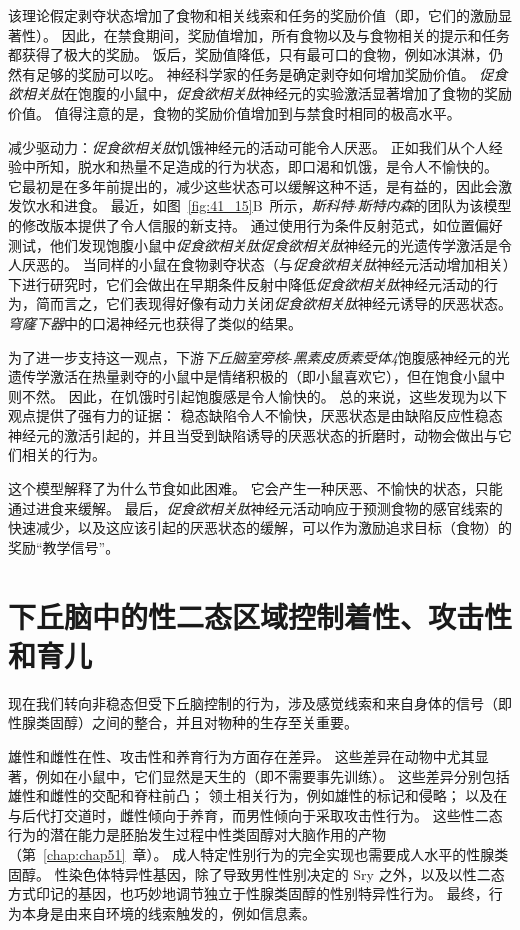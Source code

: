 该理论假定剥夺状态增加了食物和相关线索和任务的奖励价值（即，它们的激励显著性）。
因此，在禁食期间，奖励值增加，所有食物以及与食物相关的提示和任务都获得了极大的奖励。
饭后，奖励值降低，只有最可口的食物，例如冰淇淋，仍然有足够的奖励可以吃。
神经科学家的任务是确定剥夺如何增加奖励价值。
\textit{促食欲相关肽}在饱腹的小鼠中，\textit{促食欲相关肽}神经元的实验激活显著增加了食物的奖励价值。
值得注意的是，食物的奖励价值增加到与禁食时相同的极高水平。


减少驱动力：\textit{促食欲相关肽}饥饿神经元的活动可能令人厌恶。
正如我们从个人经验中所知，脱水和热量不足造成的行为状态，即口渴和饥饿，是令人不愉快的。
它最初是在多年前提出的，减少这些状态可以缓解这种不适，是有益的，因此会激发饮水和进食。
最近，如图~\ref{fig:41_15}B~所示，\textit{斯科特$\cdot$斯特内森}的团队为该模型的修改版本提供了令人信服的新支持。
通过使用行为条件反射范式，如位置偏好测试，他们发现饱腹小鼠中\textit{促食欲相关肽}\textit{促食欲相关肽}神经元的光遗传学激活是令人厌恶的。
当同样的小鼠在食物剥夺状态（与\textit{促食欲相关肽}神经元活动增加相关）下进行研究时，它们会做出在早期条件反射中降低\textit{促食欲相关肽}神经元活动的行为，简而言之，它们表现得好像有动力关闭\textit{促食欲相关肽}神经元诱导的厌恶状态。
\textit{穹窿下器}中的口渴神经元也获得了类似的结果。


为了进一步支持这一观点，下游\textit{下丘脑室旁核}-\textit{黑素皮质素受体4}饱腹感神经元的光遗传学激活在热量剥夺的小鼠中是情绪积极的（即小鼠喜欢它），但在饱食小鼠中则不然。
因此，在饥饿时引起饱腹感是令人愉快的。
总的来说，这些发现为以下观点提供了强有力的证据：
稳态缺陷令人不愉快，厌恶状态是由缺陷反应性稳态神经元的激活引起的，并且当受到缺陷诱导的厌恶状态的折磨时，动物会做出与它们相关的行为。


这个模型解释了为什么节食如此困难。
它会产生一种厌恶、不愉快的状态，只能通过进食来缓解。
最后，\textit{促食欲相关肽}神经元活动响应于预测食物的感官线索的快速减少，以及这应该引起的厌恶状态的缓解，可以作为激励追求目标（食物）的奖励“教学信号”。



\section{下丘脑中的性二态区域控制着性、攻击性和育儿}

现在我们转向非稳态但受下丘脑控制的行为，涉及感觉线索和来自身体的信号（即性腺类固醇）之间的整合，并且对物种的生存至关重要。


雄性和雌性在性、攻击性和养育行为方面存在差异。
这些差异在动物中尤其显著，例如在小鼠中，它们显然是天生的（即不需要事先训练）。
这些差异分别包括雄性和雌性的交配和脊柱前凸；
领土相关行为，例如雄性的标记和侵略；
以及在与后代打交道时，雌性倾向于养育，而男性倾向于采取攻击性行为。
这些性二态行为的潜在能力是胚胎发生过程中性类固醇对大脑作用的产物（第~\ref{chap:chap51}~章）。
成人特定性别行为的完全实现也需要成人水平的性腺类固醇。
性染色体特异性基因，除了导致男性性别决定的 Sry 之外，以及以性二态方式印记的基因，也巧妙地调节独立于性腺类固醇的性别特异性行为。
最终，行为本身是由来自环境的线索触发的，例如信息素。


